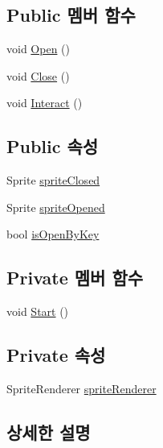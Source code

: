 \subsection*{Public 멤버 함수}
\begin{DoxyCompactItemize}
\item 
void \mbox{\hyperlink{class_door_a79629ef728511bbce03ebd1a3a133581}{Open}} ()
\item 
void \mbox{\hyperlink{class_door_a4ee490d221509a60073df05c186df9e6}{Close}} ()
\item 
void \mbox{\hyperlink{class_door_af8fed06499c3e6ffe6d993b5b341c54f}{Interact}} ()
\end{DoxyCompactItemize}
\subsection*{Public 속성}
\begin{DoxyCompactItemize}
\item 
Sprite \mbox{\hyperlink{class_door_a79ba14bf651c273978299f42e93edd9f}{sprite\+Closed}}
\item 
Sprite \mbox{\hyperlink{class_door_abb3ee74035b7cafa7c9e64f76d035c8b}{sprite\+Opened}}
\item 
bool \mbox{\hyperlink{class_door_a8e16ffccc799c6f70e5540124df53f64}{is\+Open\+By\+Key}}
\end{DoxyCompactItemize}
\subsection*{Private 멤버 함수}
\begin{DoxyCompactItemize}
\item 
void \mbox{\hyperlink{class_door_a67f37254b23f6f8770549a7e5a51f15b}{Start}} ()
\end{DoxyCompactItemize}
\subsection*{Private 속성}
\begin{DoxyCompactItemize}
\item 
Sprite\+Renderer \mbox{\hyperlink{class_door_a0e15249011da5cb777aa49235edba8db}{sprite\+Renderer}}
\end{DoxyCompactItemize}


\subsection{상세한 설명}


